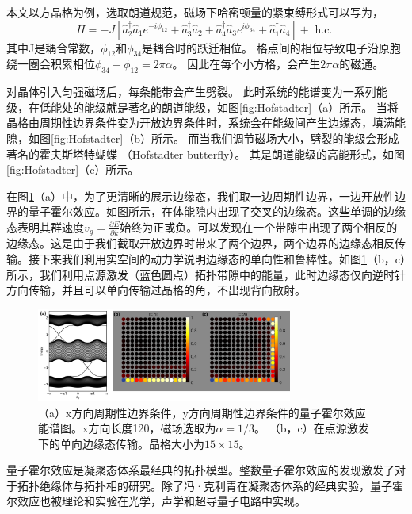 本文以方晶格为例，选取朗道规范，磁场下哈密顿量的紧束缚形式可以写为，
\begin{equation}
	H=-J\left[\hat{a}_2^{\dagger} \hat{a}_1 e^{-i \phi_{12}}+\hat{a}_3^{\dagger} \hat{a}_2+\hat{a}_4^{\dagger} \hat{a}_3 e^{i \phi_{34}}+\hat{a}_1^{\dagger} \hat{a}_4\right]+\text { h.c. }
\end{equation}
其中J是耦合常数，$\phi_{12}$和$\phi_{34}$是耦合时的跃迁相位。
格点间的相位导致电子沿原胞绕一圈会积累相位$\phi_{34}-\phi_{12}=2\pi\alpha$。
因此在每个小方格，会产生$2\pi\alpha$的磁通。

对晶体引入匀强磁场后，每条能带会产生劈裂。
此时系统的能谱变为一系列能级，在低能处的能级就是著名的朗道能级，如图\ref{fig:Hofstadter}（a）所示。
当将晶格由周期性边界条件变为开放边界条件时，系统会在能级间产生边缘态，填满能隙，如图\ref{fig:Hofstadter}（b）所示。
而当我们调节磁场大小，劈裂的能级会形成著名的霍夫斯塔特蝴蝶 （Hofstadter butterfly）。
其是朗道能级的高能形式，如图\ref{fig:Hofstadter}（c）所示。

在图\ref{fig:HallEdgeState}（a）中，为了更清晰的展示边缘态，我们取一边周期性边界，一边开放性边界的量子霍尔效应。如图所示，在体能隙内出现了交叉的边缘态。这些单调的边缘态表明其群速度$v_g=\frac{\partial E}{\partial k}$始终为正或负。可以发现在一个带隙中出现了两个相反的边缘态。这是由于我们截取开放边界时带来了两个边界，两个边界的边缘态相反传输。接下来我们利用实空间的动力学说明边缘态的单向性和鲁棒性。如图\ref{fig:HallEdgeState}（b，c）所示，我们利用点源激发（蓝色圆点）拓扑带隙中的能量，此时边缘态仅向逆时针方向传输，并且可以单向传输过晶格的角，不出现背向散射。

\begin{figure}[htbp]
	\centering
	\includegraphics[width=0.75\textwidth]{figure/Introduction/HallEdgeState.png}
 \caption{
	（a）x方向周期性边界条件，y方向周期性边界条件的量子霍尔效应能谱图。x方向长度120，磁场选取为$\alpha=1/3$。
	（b，c）在点源激发下的单向边缘态传输。晶格大小为$15\times15$。
	}
 \label{fig:HallEdgeState}
\end{figure}

量子霍尔效应是凝聚态体系最经典的拓扑模型。整数量子霍尔效应的发现激发了对于拓扑绝缘体与拓扑相的研究。除了冯·克利青在凝聚态体系的经典实验\cite{klitzing1980new}，量子霍尔效应也被理论和实验在光学\cite{Haldane2008prl,Haldane2008pra,ZhengWang2008prl,wang2009observation,hafezi2011robust,hafezi2013imaging,rechtsman2013strain}，声学\cite{wen2019acoustic}和超导量子电路\cite{xiang2023simulating,wang2024realization}中实现。

